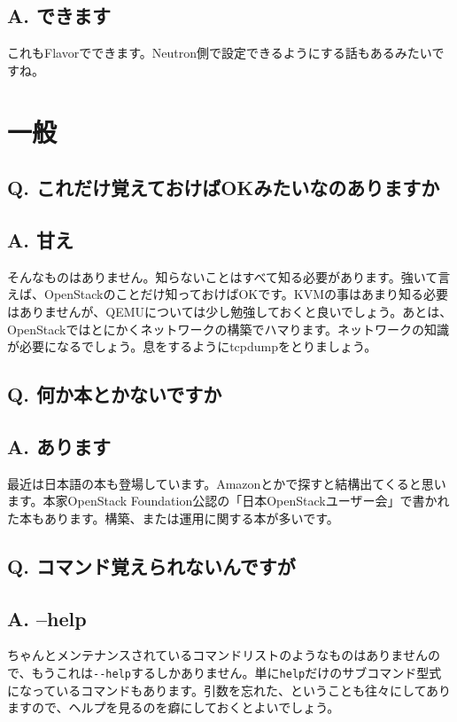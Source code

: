 \documentclass[9pt,b5paper,tombo,openany]{jsbook}
\begin{document}
\subsection*{{\LARGE\bfseries A.} できます}
これもFlavorでできます。Neutron側で設定できるようにする話もあるみたいですね。\\

\section{一般}

\subsection*{{\LARGE\bfseries Q.} これだけ覚えておけばOKみたいなのありますか}
\subsection*{{\LARGE\bfseries A.} 甘え}
そんなものはありません。知らないことはすべて知る必要があります。強いて言えば、OpenStackのことだけ知っておけばOKです。KVMの事はあまり知る必要はありませんが、QEMUについては少し勉強しておくと良いでしょう。あとは、OpenStackではとにかくネットワークの構築でハマります。ネットワークの知識が必要になるでしょう。息をするようにtcpdumpをとりましょう。

\subsection*{{\LARGE\bfseries Q.} 何か本とかないですか}
\subsection*{{\LARGE\bfseries A.} あります}
最近は日本語の本も登場しています。Amazonとかで探すと結構出てくると思います。本家OpenStack Foundation公認の「日本OpenStackユーザー会」で書かれた本もあります。構築、または運用に関する本が多いです。

\subsection*{{\LARGE\bfseries Q.} コマンド覚えられないんですが}
\subsection*{{\LARGE\bfseries A.} --help}
ちゃんとメンテナンスされているコマンドリストのようなものはありませんので、もうこれは\verb|--help|するしかありません。単に\verb|help|だけのサブコマンド型式になっているコマンドもあります。引数を忘れた、ということも往々にしてありますので、ヘルプを見るのを癖にしておくとよいでしょう。
\end{document}
